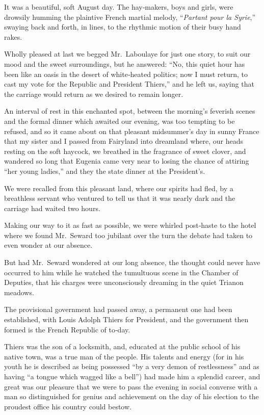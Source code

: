 \documentclass[12pt]{book}
\begin{document}
It was a beautiful, soft August day. The hay‐makers, boys and girls, were
drowsily humming the plaintive French martial melody, “{\it Partant pour la Syrie},”
swaying back and forth, in lines, to the rhythmic motion of their busy hand rakes.

Wholly pleased at last we begged Mr.~Laboulaye for just one story, to suit
our mood and the sweet surroundings, but he answered: “No, this quiet hour has
been like an oasis in the desert of white‐heated politics; now I must return, to
cast my vote for the Republic and President Thiers,” and he left us, saying that the
carriage would return as we desired to remain longer.

An interval of rest in this enchanted spot, between the morning’s feverish
scenes and the formal dinner which awaited our evening, was too tempting to
be refused, and so it came about on that pleasant midsummer’s day in sunny
France that my sister and I passed from Fairyland into dreamland where, our
heads resting on the soft haycock, we breathed in the fragrance of sweet clover,
and wandered so long that Eugenia came very near to losing the chance of attiring
“her young ladies,” and they the state dinner at the President’s.

We were recalled from this pleasant land, where our spirits had fled, by a
breathless servant who ventured to tell us that it was nearly dark and the carriage
had waited two hours.

Making our way to it as fast as possible, we were whirled post‐haste to the
hotel where we found Mr.~Seward too jubilant over the turn the debate had taken
to even wonder at our absence.

But had Mr.~Seward wondered at our long absence, the thought could never
have occurred to him while he watched the tumultuous scene in the Chamber
of Deputies, that his charges were unconsciously dreaming in the quiet Trianon
meadows.

The provisional government had passed away, a permanent one had been
established, with Louis Adolph Thiers for President, and the government then
formed is the French Republic of to‐day.

Thiers was the son of a locksmith, and, educated at the public school of his
native town, was a true man of the people. His talents and energy (for in his
youth he is described as being possessed “by a very demon of restlessness” and as
having “a tongue which wagged like a bell”) had made him a splendid career, and
great was our pleasure that we were to pass the evening in social converse with a
man so distinguished for genius and achievement on the day of his election to
the proudest office his country could bestow.
\end{document}

